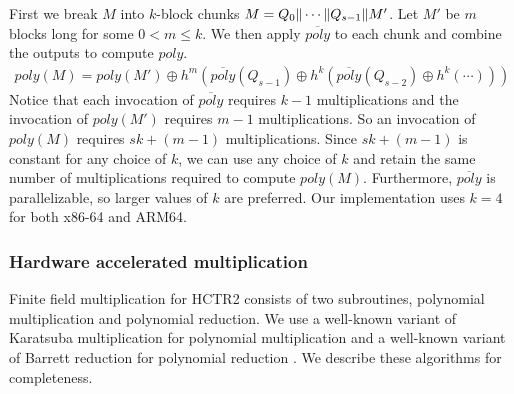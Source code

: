 \documentclass[hctr.tex]{subfiles}
\begin{document}
First we break $M$ into $k$-block chunks $M = Q_0 \Vert \cdots \Vert Q_{s-1} \Vert M'$. Let $M'$ be $m$ blocks long for some $0 < m \le k$. We then apply $\overline{poly}$ to each chunk and combine the outputs to compute $poly$. 
\begin{gather*}
       poly(M) = poly(M') \oplus h^m(\overline{poly}(Q_{s-1}) \oplus h^k(\overline{poly}(Q_{s-2}) \oplus h^k(\cdots)))
\end{gather*}
Notice that each invocation of $\overline{poly}$ requires $k-1$ multiplications and the invocation of $poly(M')$ requires $m-1$ multiplications. So an invocation of $poly(M)$ requires $sk + (m-1)$ multiplications. Since $sk + (m-1)$ is constant for any choice of $k$, we can use any choice of $k$ and retain the same number of multiplications required to compute $poly(M)$. Furthermore, $\overline{poly}$ is parallelizable, so larger values of $k$ are preferred. Our implementation uses $k = 4$ for both x86-64 and ARM64.

\subsubsection{Hardware accelerated multiplication}
Finite field multiplication for HCTR2 consists of two subroutines, polynomial multiplication and polynomial reduction. We use a well-known variant of Karatsuba multiplication for polynomial multiplication and a well-known variant of Barrett reduction for polynomial reduction \cite{CLMUL}. We describe these algorithms for completeness.
\end{document}
